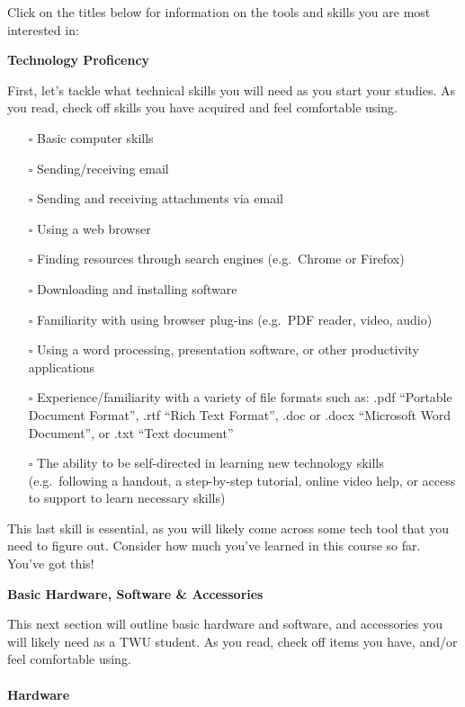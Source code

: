\documentclass[
]{book}
\providecommand{\tightlist}{%
  \setlength{\itemsep}{0pt}\setlength{\parskip}{0pt}}
\theoremstyle{definition}
\theoremstyle{definition}
\theoremstyle{definition}
\theoremstyle{definition}
\theoremstyle{remark}
\begin{document}
Click on the titles below for information on the tools and skills you are most interested in:

\textbf{Technology Proficency}

First, let's tackle what technical skills you will need as you start your studies. As you read, check off skills you have acquired and feel comfortable using.

\begin{itemize}
\tightlist
\item[$\square$]
  Basic computer skills
\item[$\square$]
  Sending/receiving email
\item[$\square$]
  Sending and receiving attachments via email
\item[$\square$]
  Using a web browser
\item[$\square$]
  Finding resources through search engines (e.g.~Chrome or Firefox)
\item[$\square$]
  Downloading and installing software
\item[$\square$]
  Familiarity with using browser plug-ins (e.g.~PDF reader, video, audio)
\item[$\square$]
  Using a word processing, presentation software, or other productivity applications
\item[$\square$]
  Experience/familiarity with a variety of file formats such as: .pdf ``Portable Document Format'', .rtf ``Rich Text Format'', .doc or .docx ``Microsoft Word Document'', or .txt ``Text document''
\item[$\square$]
  The ability to be self-directed in learning new technology skills (e.g.~following a handout, a step-by-step tutorial, online video help, or access to support to learn necessary skills)
\end{itemize}

This last skill is essential, as you will likely come across some tech tool that you need to figure out. Consider how much you've learned in this course so far. You've got this!

\textbf{Basic Hardware, Software \& Accessories}

This next section will outline basic hardware and software, and accessories you will likely need as a TWU student. As you read, check off items you have, and/or feel comfortable using.

\hypertarget{hardware}{%
\paragraph*{Hardware}\label{hardware}}
\end{document}
